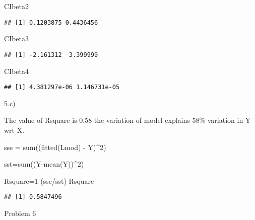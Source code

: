 \documentclass[
]{article}
\newenvironment{Shaded}{\begin{snugshade}}{\end{snugshade}}
\newcommand{\DecValTok}[1]{\textcolor[rgb]{0.00,0.00,0.81}{#1}}
\newcommand{\FunctionTok}[1]{\textcolor[rgb]{0.00,0.00,0.00}{#1}}
\newcommand{\NormalTok}[1]{#1}
\newcommand{\OtherTok}[1]{\textcolor[rgb]{0.56,0.35,0.01}{#1}}
\newcommand{\SpecialCharTok}[1]{\textcolor[rgb]{0.00,0.00,0.00}{#1}}
\begin{document}
\begin{Shaded}
\begin{Highlighting}[]
\NormalTok{CIbeta2}
\end{Highlighting}
\end{Shaded}

\begin{verbatim}
## [1] 0.1203875 0.4436456
\end{verbatim}

\begin{Shaded}
\begin{Highlighting}[]
\NormalTok{CIbeta3}
\end{Highlighting}
\end{Shaded}

\begin{verbatim}
## [1] -2.161312  3.399999
\end{verbatim}

\begin{Shaded}
\begin{Highlighting}[]
\NormalTok{CIbeta4}
\end{Highlighting}
\end{Shaded}

\begin{verbatim}
## [1] 4.381297e-06 1.146731e-05
\end{verbatim}

5.c)

The value of Rsquare is 0.58 the variation of model explains 58\%
variation in Y wrt X.

\begin{Shaded}
\begin{Highlighting}[]
\NormalTok{sse }\OtherTok{=} \FunctionTok{sum}\NormalTok{((}\FunctionTok{fitted}\NormalTok{(Lmod) }\SpecialCharTok{{-}}\NormalTok{ Y)}\SpecialCharTok{\^{}}\DecValTok{2}\NormalTok{)}

\NormalTok{sst}\OtherTok{=}\FunctionTok{sum}\NormalTok{((Y}\SpecialCharTok{{-}}\FunctionTok{mean}\NormalTok{(Y))}\SpecialCharTok{\^{}}\DecValTok{2}\NormalTok{)}

\NormalTok{Rsquare}\OtherTok{=}\DecValTok{1}\SpecialCharTok{{-}}\NormalTok{(sse}\SpecialCharTok{/}\NormalTok{sst)}
\NormalTok{Rsquare}
\end{Highlighting}
\end{Shaded}

\begin{verbatim}
## [1] 0.5847496
\end{verbatim}

Problem 6
\end{document}
